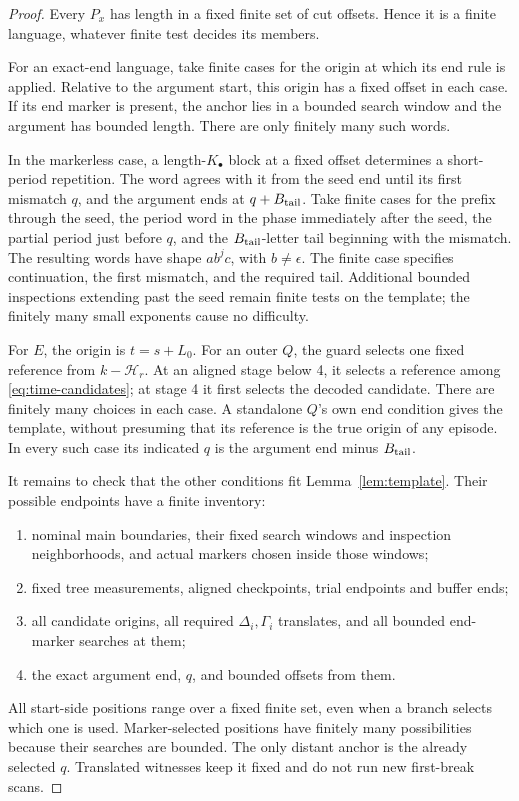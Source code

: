 \begin{proof}
Every \(P_x\) has length in a fixed finite set of cut offsets. Hence it is a
finite language, whatever finite test decides its members.

For an exact-end language, take finite cases for the origin at which its end
rule is applied. Relative to the argument start, this origin has a fixed offset
in each case. If its end marker is present, the anchor lies in a bounded search
window and the argument has bounded length. There are only finitely many such
words.

In the markerless case, a length-\(K_\bullet\) block at a fixed offset
determines a short-period repetition. The word agrees with it from the seed
end until its first mismatch \(q\), and the argument ends at \(q+B_{\rm tail}\).
Take finite cases for the prefix through the seed, the period word in the phase
immediately after the seed, the partial period just before \(q\), and the
\(B_{\rm tail}\)-letter tail beginning with the mismatch. The resulting words
have shape \(ab^jc\), with \(b\ne\epsilon\).
The finite case specifies continuation, the first mismatch, and the required
tail. Additional bounded inspections extending past the seed remain finite
tests on the template; the finitely many small exponents cause no difficulty.

For \(E\), the origin is \(t=s+L_0\).
For an outer \(Q\), the guard selects one fixed reference from
\(k-\mathcal H_r\). At an aligned stage below 4, it selects a reference among
\eqref{eq:time-candidates}; at stage 4 it first selects the decoded candidate.
There are finitely many choices in each case. A standalone \(Q\)'s own end
condition gives the template, without presuming that its reference is the
true origin of any episode. In every such case its indicated \(q\) is the
argument end minus \(B_{\rm tail}\).

It remains to check that the other conditions fit Lemma~\ref{lem:template}.
Their possible endpoints have a finite inventory:
\begin{enumerate}[label=\textup{(\alph*)}]
\item nominal main boundaries, their fixed search windows and inspection
neighborhoods, and actual markers chosen inside those windows;
\item fixed tree measurements, aligned checkpoints, trial endpoints and
buffer ends;
\item all candidate origins, all required \(\Delta_i,\Gamma_i\) translates,
and all bounded end-marker searches at them;
\item the exact argument end, \(q\), and bounded offsets from them.
\end{enumerate}
All start-side positions range over a fixed finite set, even when a branch
selects which one is used. Marker-selected positions have finitely many
possibilities because their searches are bounded. The only distant anchor is
the already selected \(q\). Translated witnesses keep it fixed and do not run
new first-break scans.


\end{proof}
